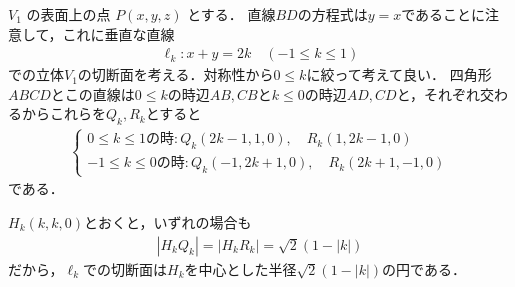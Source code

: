 \documentclass[../../main.tex]{subfiles}
\begin{document}
$V_1$ の表面上の点 $P(x,y,z)$ とする．
直線$BD$の方程式は$y=x$であることに注意して，これに垂直な直線
\begin{align}
  \ell_k: x+y = 2k \quad (-1 \le k \le 1)
\end{align}
での立体$V_1$の切断面を考える．対称性から$0 \le k$に絞って考えて良い．
四角形$ABCD$とこの直線は$0 \le k$の時辺$AB, CB$と$k \le 0$の時辺$AD,CD$と，それぞれ交わるからこれらを$Q_k,R_k$とすると
\begin{align}
  \begin{cases}
    0 \le k \le 1 \text{の時}:  Q_k(2k-1,1, 0), \quad R_k(1,2k-1,0) \\
    -1 \le k \le 0 \text{の時}: Q_k(-1, 2k+1,0), \quad R_k(2k+1,-1,0)
  \end{cases} \label{eq:1}
\end{align}
である．

$H_k(k,k,0)$とおくと，いずれの場合も
\begin{align}
  |H_kQ_k|=|H_kR_k|= \sqrt{2}(1-|k|) \label{eq:2}
\end{align}
だから，$\ell_k$での切断面は$H_k$を中心とした半径$\sqrt{2}(1-|k|)$の円である．
\end{document}

